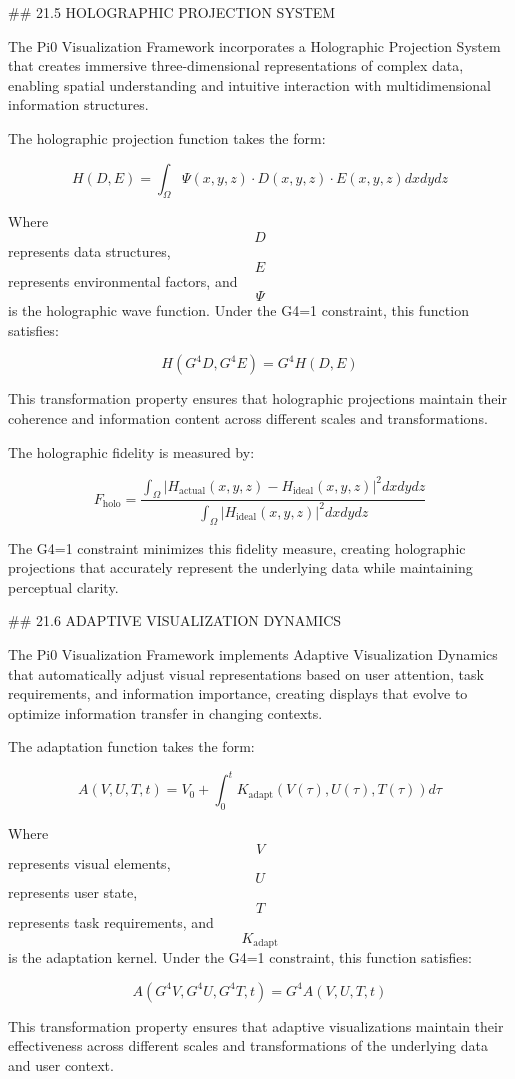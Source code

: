 ## 21.5 HOLOGRAPHIC PROJECTION SYSTEM

The Pi0 Visualization Framework incorporates a Holographic Projection System that creates immersive three-dimensional representations of complex data, enabling spatial understanding and intuitive interaction with multidimensional information structures.

The holographic projection function takes the form:

$$ H(D, E) = \int_{\Omega} \Psi(x, y, z) \cdot D(x, y, z) \cdot E(x, y, z) dx dy dz $$

Where $$ D $$ represents data structures, $$ E $$ represents environmental factors, and $$ \Psi $$ is the holographic wave function. Under the G4=1 constraint, this function satisfies:

$$ H(G^4 D, G^4 E) = G^4 H(D, E) $$

This transformation property ensures that holographic projections maintain their coherence and information content across different scales and transformations.

The holographic fidelity is measured by:

$$ F_{\text{holo}} = \frac{\int_{\Omega} |H_{\text{actual}}(x, y, z) - H_{\text{ideal}}(x, y, z)|^2 dx dy dz}{\int_{\Omega} |H_{\text{ideal}}(x, y, z)|^2 dx dy dz} $$

The G4=1 constraint minimizes this fidelity measure, creating holographic projections that accurately represent the underlying data while maintaining perceptual clarity.

## 21.6 ADAPTIVE VISUALIZATION DYNAMICS

The Pi0 Visualization Framework implements Adaptive Visualization Dynamics that automatically adjust visual representations based on user attention, task requirements, and information importance, creating displays that evolve to optimize information transfer in changing contexts.

The adaptation function takes the form:

$$ A(V, U, T, t) = V_0 + \int_0^t K_{\text{adapt}}(V(\tau), U(\tau), T(\tau)) d\tau $$

Where $$ V $$ represents visual elements, $$ U $$ represents user state, $$ T $$ represents task requirements, and $$ K_{\text{adapt}} $$ is the adaptation kernel. Under the G4=1 constraint, this function satisfies:

$$ A(G^4 V, G^4 U, G^4 T, t) = G^4 A(V, U, T, t) $$

This transformation property ensures that adaptive visualizations maintain their effectiveness across different scales and transformations of the underlying data and user context.

